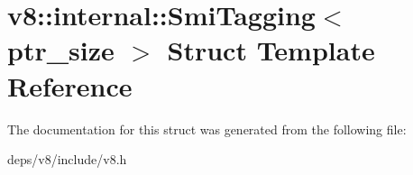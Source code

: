 \hypertarget{structv8_1_1internal_1_1_smi_tagging}{}\section{v8\+:\+:internal\+:\+:Smi\+Tagging$<$ ptr\+\_\+size $>$ Struct Template Reference}
\label{structv8_1_1internal_1_1_smi_tagging}


The documentation for this struct was generated from the following file\+:\begin{DoxyCompactItemize}
\item 
deps/v8/include/v8.\+h\end{DoxyCompactItemize}

